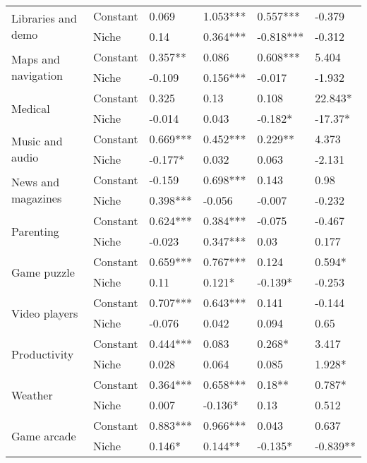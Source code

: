 \begin{table}[h!]
\begin{tabular}{llllll}
\cline{1-6}
\multirow{2}{*}{Libraries and demo} & Constant &  0.069 &  1.053*** &  0.557*** &  -0.379 \\
          & Niche &  0.14 &  0.364*** &  -0.818*** &  -0.312 \\
\cline{1-6}
\multirow{2}{*}{Maps and navigation} & Constant &  0.357** &  0.086 &  0.608*** &  5.404 \\
          & Niche &  -0.109 &  0.156*** &  -0.017 &  -1.932 \\
\cline{1-6}
\multirow{2}{*}{Medical} & Constant &  0.325 &  0.13 &  0.108 &  22.843* \\
          & Niche &  -0.014 &  0.043 &  -0.182* &  -17.37* \\
\cline{1-6}
\multirow{2}{*}{Music and audio} & Constant &  0.669*** &  0.452*** &  0.229** &  4.373 \\
          & Niche &  -0.177* &  0.032 &  0.063 &  -2.131 \\
\cline{1-6}
\multirow{2}{*}{News and magazines} & Constant &  -0.159 &  0.698*** &  0.143 &  0.98 \\
          & Niche &  0.398*** &  -0.056 &  -0.007 &  -0.232 \\
\cline{1-6}
\multirow{2}{*}{Parenting} & Constant &  0.624*** &  0.384*** &  -0.075 &  -0.467 \\
          & Niche &  -0.023 &  0.347*** &  0.03 &  0.177 \\
\cline{1-6}
\multirow{2}{*}{Game puzzle} & Constant &  0.659*** &  0.767*** &  0.124 &  0.594* \\
          & Niche &  0.11 &  0.121* &  -0.139* &  -0.253 \\
\cline{1-6}
\multirow{2}{*}{Video players} & Constant &  0.707*** &  0.643*** &  0.141 &  -0.144 \\
          & Niche &  -0.076 &  0.042 &  0.094 &  0.65 \\
\cline{1-6}
\multirow{2}{*}{Productivity} & Constant &  0.444*** &  0.083 &  0.268* &  3.417 \\
          & Niche &  0.028 &  0.064 &  0.085 &  1.928* \\
\cline{1-6}
\multirow{2}{*}{Weather} & Constant &  0.364*** &  0.658*** &  0.18** &  0.787* \\
          & Niche &  0.007 &  -0.136* &  0.13 &  0.512 \\
\cline{1-6}
\multirow{2}{*}{Game arcade} & Constant &  0.883*** &  0.966*** &  0.043 &  0.637 \\
          & Niche &  0.146* &  0.144** &  -0.135* &  -0.839** \\

\end{tabular}
\end{table}
